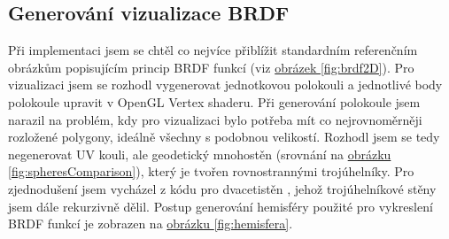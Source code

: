 \documentclass[czech,master,dept460,male,cpp,cpdeclaration]{diploma}
\begin{document}
\subsection{Generování vizualizace BRDF}
Při implementaci jsem se chtěl co nejvíce přiblížit standardním referenčním obrázkům popisujícím princip BRDF funkcí (viz \hyperref[fig:brdf2D]{obrázek \ref{fig:brdf2D}}). Pro vizualizaci jsem se rozhodl vygenerovat jednotkovou polokouli a jednotlivé body polokoule upravit v OpenGL Vertex shaderu. Při generování polokoule jsem narazil na problém, kdy pro vizualizaci bylo potřeba mít co nejrovnoměrněji rozložené polygony, ideálně všechny s podobnou velikostí. Rozhodl jsem se tedy negenerovat UV kouli, ale geodetický mnohostěn (srovnání na \hyperref[fig:spheresComparison]{obrázku \ref{fig:spheresComparison}}), který je tvořen rovnostrannými trojúhelníky. Pro zjednodušení jsem vycházel z kódu pro dvacetistěn \cite{OpenGLSphere}, jehož trojúhelníkové stěny jsem dále rekurzivně dělil. Postup generování hemisféry použité pro vykreslení BRDF funkcí je zobrazen na \hyperref[fig:hemisfera]{obrázku \ref{fig:hemisfera}}.
\end{document}
